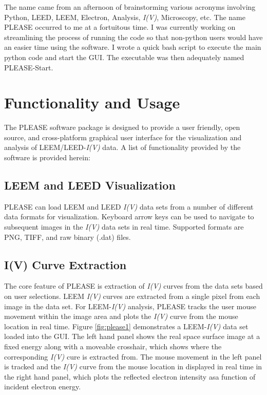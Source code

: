 The name came from an afternoon of brainstorming various acronyms involving Python, LEED, LEEM, Electron, Analysis, \textit{I(V)}, Microscopy, etc. The name PLEASE occurred to me at a fortuitous time. I was currently working on streamlining the process of running the code so that non-python users would have an easier time using the software. I wrote a quick bash script to execute the main python code and start the GUI. The executable was then adequately named PLEASE-Start.



\section{Functionality and Usage}

The PLEASE software package is designed to provide a user friendly, open source, and cross-platform graphical user interface for the visualization and analysis of LEEM/LEED-\textit{I(V)} data. A list of functionality provided by the software is provided herein:


\subsection{LEEM and LEED Visualization}

PLEASE can load LEEM and LEED \textit{I(V)} data sets from a number of different data formats for visualization. Keyboard arrow keys can be used to navigate to subsequent images in the \textit{I(V)} data sets in real time. Supported formats are PNG, TIFF, and raw binary (.dat) files.

\subsection{I(V) Curve Extraction}
The core feature of PLEASE is extraction of \textit{I(V)} curves from the data sets based on user selections. LEEM \textit{I(V)} curves are extracted from a single pixel from each image in the data set. For LEEM-\textit{I(V)} analysis, PLEASE tracks the user mouse movement within the image area and plots the \textit{I(V)} curve from the mouse location in real time. Figure \ref{fig:please1} demonstrates a LEEM-\textit{I(V)} data set loaded into the GUI. The left hand panel shows the real space surface image at a fixed energy along with a moveable crosshair, which shows where the corresponding \textit{I(V)} cure is extracted from. The mouse movement in the left panel is tracked and the \textit{I(V)} curve from the mouse location in displayed in real time in the right hand panel, which plots the reflected electron intensity asa  function of incident electron energy.

